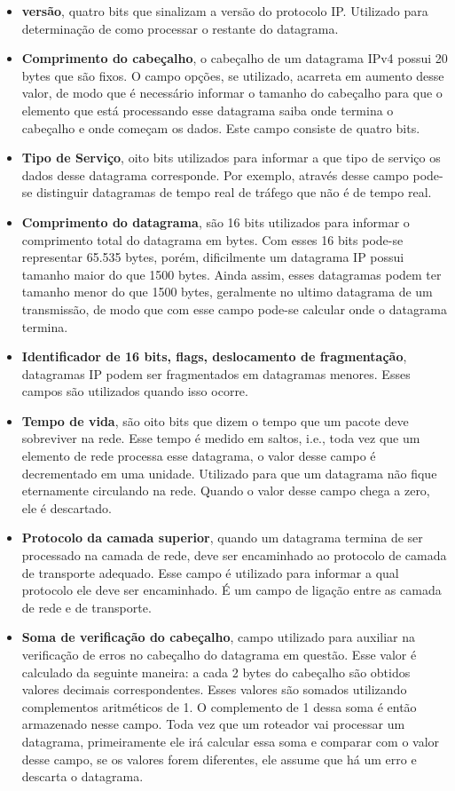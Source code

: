 \documentclass[	12pt, Times, openright, twoside, a4paper, english, brazil]{abntex2}
\begin{document}
\begin{itemize}
    \item{\textbf{versão}}, quatro bits que sinalizam a versão do protocolo IP. Utilizado para determinação de como processar o restante do datagrama.
    \item{\textbf{Comprimento do cabeçalho}}, o cabeçalho de um datagrama  IPv4 possui 20 bytes que são fixos. O campo opções, se utilizado, acarreta em aumento desse valor, de modo que é necessário informar o tamanho do cabeçalho para que o elemento que está processando esse datagrama saiba onde termina o cabeçalho e onde começam os dados. Este campo consiste de quatro bits.
    \item{\textbf{Tipo de Serviço}}, oito bits utilizados para informar a que tipo de serviço os dados desse datagrama corresponde. Por exemplo, através desse campo pode-se distinguir datagramas de tempo real de tráfego que não é de tempo real.
    \item{\textbf{Comprimento do datagrama}}, são 16 bits utilizados para informar o comprimento total do datagrama em bytes. Com esses 16 bits pode-se representar 65.535 bytes, porém, dificilmente um datagrama IP possui tamanho maior do que 1500 bytes. Ainda assim, esses datagramas podem ter tamanho menor do que 1500 bytes, geralmente no ultimo datagrama de um transmissão, de modo que com esse campo pode-se calcular onde o datagrama termina.
    \item{\textbf{Identificador de 16 bits, flags, deslocamento de fragmentação}}, datagramas IP podem ser fragmentados em datagramas menores. Esses campos são utilizados quando isso ocorre.
    \item{\textbf{Tempo de vida}}, são oito bits que dizem o tempo que um pacote deve sobreviver na rede. Esse tempo é medido em saltos, i.e., toda vez que um elemento de rede processa esse datagrama, o valor desse campo é decrementado em uma unidade. Utilizado para que um datagrama não fique eternamente circulando na rede. Quando o valor desse campo chega a zero, ele é descartado.
    \item{\textbf{Protocolo da camada superior}}, quando um datagrama termina de ser processado na camada de rede, deve ser encaminhado ao protocolo de camada de transporte adequado. Esse campo é utilizado para informar a qual protocolo ele deve ser encaminhado. É um campo de ligação entre as camada de rede e de transporte.
    \item{\textbf{Soma de verificação do cabeçalho}}, campo utilizado para auxiliar na verificação de erros no cabeçalho do datagrama em questão. Esse valor é calculado da seguinte maneira: a cada 2 bytes do cabeçalho são obtidos valores decimais correspondentes. Esses valores são somados utilizando complementos aritméticos de 1. O complemento de 1 dessa soma é então armazenado nesse campo. Toda vez que um roteador vai processar um datagrama, primeiramente ele irá calcular essa soma e comparar com o valor desse campo, se os valores forem diferentes, ele assume que há um erro e descarta o datagrama.

\end{itemize}
\end{document}
